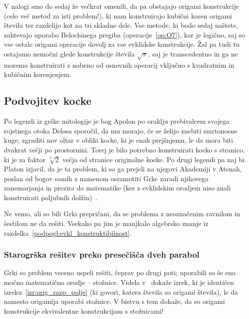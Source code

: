 V nalogi smo do sedaj že večkrat omenili, da pa obstajajo origami konstrukcije (celo več metod za isti problem!), ki nam konstruirajo kubični koren origami števila ter razdelijo kot na tri skladne dele. Vse metode, ki bodo sedaj naštete, zahtevajo uporabo Belochinega pregiba (operacije~\ref{op:O7}), kar je logično, saj so vse ostale origami operacije dovolj za vse evklidske konstrukcije. Žal pa tudi tu ostajamo nemočni glede konstrukcije števila $\sqrt{\pi}$, saj je transcedentno in ga ne moremo konstruirati z nobeno od osnovnih operacij vključno s kvadratnim in kubičnim korenjenjem.

\subsection{Podvojitev kocke}
\label{podpogl:podvojitev_kocke}

Po legendi iz grške mitologije je bog Apolon po oraklju prebivalcem svojega rojstnega otoka Delosa sporočil, da mu morajo, če se želijo znebiti smrtonosne kuge, zgraditi nov oltar v obliki kocke, ki je enak prejšnjemu, le da mora biti dvakrat večji po prostornini. Torej je bilo potrebno konstruirati kocko s stranico, ki je za faktor $\sqrt[3]{2}$ večja od stranice originalne kocke. Po drugi legendi pa naj bi Platon izjavil, da je ta problem, ki so ga prejeli na njegovi Akademiji v Atenah, poslan od bogov samih z namenom osramotiti Grke zaradi njihovega zanemarjanja in prezira do matematike (ker z evklidskim orodjem niso znali konstruirati poljubnih dolžin)~\cite[str.\ 29]{geometricconstructions}.

Ne vemo, ali so bili Grki prepričani, da se problema z neoznačenim ravnilom in šestilom ne da rešiti. Vsekako pa jim je manjkalo algebrsko znanje iz razdelka~\ref{podpogl:evkl_konstruktibilnost}.

\subsubsection*{Starogrška rešitev preko presečišča dveh parabol}

Grki so problem vseeno uspeli rešiti, čeprav po drugi poti; uporabili so še eno močno matematično orodje -- stožnice. Videla v~\cite{videla1997} dokaže izrek, ki je identičen izreku~\ref{izr:orig_razp_polje} (ki govori, katera števila so origami števila), le da namesto origamija uporabi stožnice. V bistvu s tem dokaže, da so origami konstrukcije ekvivalentne konstrukcijam s stožnicami!

